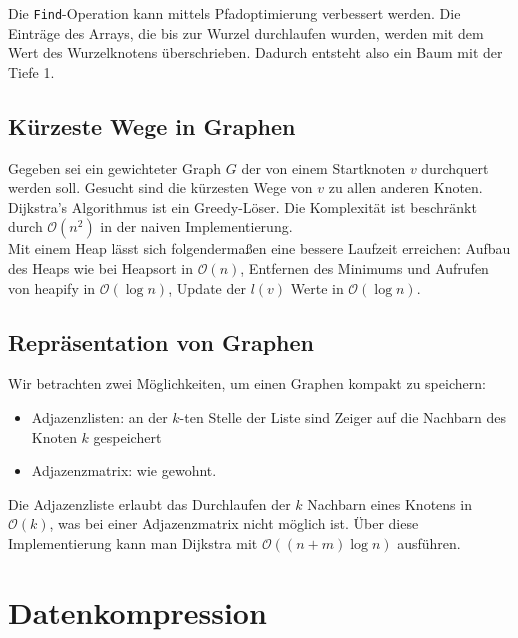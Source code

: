 \documentclass[a4paper, 12pt]{article}
\begin{document}
	Die \texttt{Find}-Operation kann mittels Pfadoptimierung verbessert werden. Die Einträge des Arrays, die bis zur Wurzel durchlaufen wurden, werden mit dem Wert des Wurzelknotens überschrieben. Dadurch entsteht also ein Baum mit der Tiefe 1.
	\subsection{Kürzeste Wege in Graphen}
	Gegeben sei ein gewichteter Graph $G$ der von einem Startknoten $v$ durchquert werden soll. Gesucht sind die kürzesten Wege von $v$ zu allen anderen Knoten.\\
	Dijkstra's Algorithmus ist ein Greedy-Löser. Die Komplexität ist beschränkt durch $\mathcal{O}(n^2)$ in der naiven Implementierung.\\
	
	Mit einem Heap lässt sich folgendermaßen eine bessere Laufzeit erreichen: Aufbau des Heaps wie bei Heapsort in $\mathcal{O}(n)$, Entfernen des Minimums und Aufrufen von heapify in $\mathcal{O}(\log n)$, Update der $l(v)$ Werte in $\mathcal{O}(\log n)$.
	\subsection{Repräsentation von Graphen}
	Wir betrachten zwei Möglichkeiten, um einen Graphen kompakt zu speichern: \begin{itemize}
		\item Adjazenzlisten: an der $k$-ten Stelle der Liste sind Zeiger auf die Nachbarn des Knoten $k$ gespeichert
		\item Adjazenzmatrix: wie gewohnt.
	\end{itemize}
	Die Adjazenzliste erlaubt das Durchlaufen der $k$ Nachbarn eines Knotens in $\mathcal{O}(k)$, was bei einer Adjazenzmatrix nicht möglich ist. Über diese Implementierung kann man Dijkstra mit $\mathcal{O}((n+m)\log n)$ ausführen.
	
	\section{Datenkompression}
\end{document}
